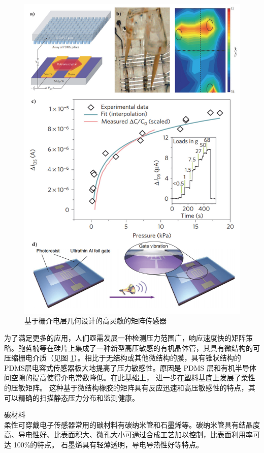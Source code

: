 \documentclass[UTF8,9pt]{ctexart}
\begin{document}
{    \begin{figure}[htbp]
        \centering
        \includegraphics[scale=0.3]{13.png}
        \caption{基于栅介电层几何设计的高灵敏的矩阵传感器}
        \label{rx4} 
    \end{figure}
    为了满足更多的应用，人们亟需发展一种检测压力范围广，响应速度快的矩阵策略。鲍哲楠等在硅片上集成了一种新型高压敏感的有机晶体管，其具有微结构的可压缩栅电介质（见图 \ref{rx4}）。相比于无结构或其他微结构的膜，具有锥状结构的PDMS层电容式传感器极大地提高了压力敏感性。原因是 PDMS 层和有机半导体间空隙的提高使得介电常数降低。在此基础上， 进一步在塑料基底上发展了柔性的压敏矩阵。 这种基于微结构橡胶的矩阵具有反应迅速和高压敏感性的特点，其可以精确的扫描静态压力分布和监测健康。

    \item 碳材料\\
    柔性可穿戴电子传感器常用的碳材料有碳纳米管和石墨烯等。碳纳米管具有结晶度高、导电性好、比表面积大、微孔大小可通过合成工艺加以控制，比表面利用率可达 100\%的特点。 石墨烯具有轻薄透明，导电导热性好等特点。
}
\end{document}
